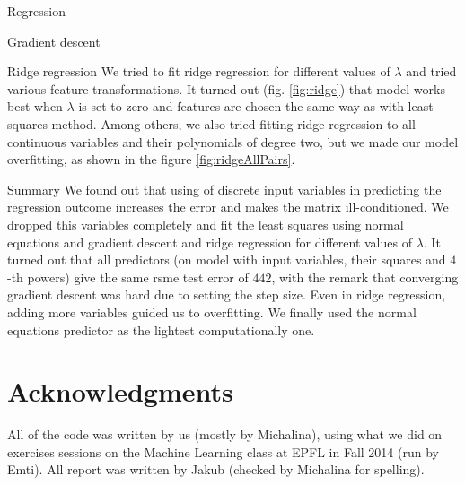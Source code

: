 \documentclass{article}
\begin{document}
\begin{section}{Regression}
\begin{subsection}{Gradient descent}
\end{subsection}
\begin{subsection}{Ridge regression}
We tried to fit ridge regression for different values of $\lambda$ and tried various feature transformations. It turned out (fig. \ref{fig:ridge}) that model works best when $\lambda$ is set to zero and features are chosen the same way as with least squares method. Among others, we also tried fitting ridge regression to all continuous variables and their polynomials of degree two, but we made our model overfitting, as shown in the figure \ref{fig:ridgeAllPairs}.
\begin{figure}[!h]
\center
{}
\hfill
\caption{}
\end{figure}
\end{subsection}
\begin{subsection}{Summary}
We found out that using of discrete input variables in predicting the regression outcome increases the error and makes the matrix ill-conditioned. We dropped this variables completely and fit the least squares using normal equations and gradient descent and ridge regression for different values of $\lambda$. It turned out that all predictors (on model with input variables, their squares and $4$-th powers) give the same rsme test error of $442$, with the remark that converging gradient descent was hard due to setting the step size. Even in ridge regression, adding more variables guided us to overfitting. We finally used the normal equations predictor as the lightest computationally one.
\end{subsection}
\end{section}

\section*{Acknowledgments}
All of the code was written by us (mostly by Michalina), using what we did on exercises sessions on the Machine Learning class at EPFL in Fall 2014 (run by Emti). All report was written by Jakub (checked by Michalina for spelling).
\end{document}
